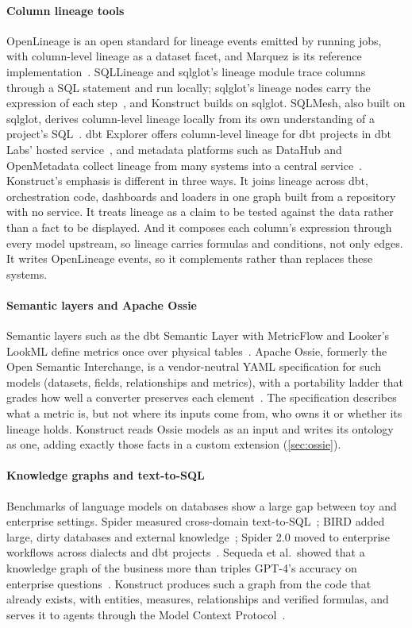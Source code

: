 \paragraph{Column lineage tools}
OpenLineage is an open standard for lineage events emitted by running jobs, with column-level
lineage as a dataset facet, and Marquez is its reference
implementation~\citep{openlineage,marquez}. SQLLineage and sqlglot's lineage module trace columns
through a SQL statement and run locally; sqlglot's lineage nodes carry the expression of each
step~\citep{sqllineage,sqlglot}, and Konstruct builds on sqlglot. SQLMesh, also built on sqlglot,
derives column-level lineage locally from its own understanding of a project's
SQL~\citep{sqlmesh}. dbt Explorer offers column-level lineage for dbt projects in dbt Labs' hosted
service~\citep{dbtcll}, and metadata platforms such as DataHub and OpenMetadata collect lineage
from many systems into a central service~\citep{datahub,openmetadata}. Konstruct's emphasis is
different in three ways. It joins lineage across dbt, orchestration code, dashboards and loaders
in one graph built from a repository with no service. It treats lineage as a claim to be tested
against the data rather than a fact to be displayed. And it composes each column's expression
through every model upstream, so lineage carries formulas and conditions, not only edges. It
writes OpenLineage events, so it complements rather than replaces these systems.

\paragraph{Semantic layers and Apache Ossie}
Semantic layers such as the dbt Semantic Layer with MetricFlow and Looker's LookML define metrics
once over physical tables~\citep{dbtsemantic,lookml}. Apache Ossie, formerly the Open Semantic
Interchange, is a vendor-neutral YAML specification for such models (datasets, fields,
relationships and metrics), with a portability ladder that grades how well a converter preserves
each element~\citep{ossie}. The specification describes what a metric is, but not where its
inputs come from, who owns it or whether its lineage holds. Konstruct reads Ossie models as an
input and writes its ontology as one, adding exactly those facts in a custom extension
(\cref{sec:ossie}).

\paragraph{Knowledge graphs and text-to-SQL}
Benchmarks of language models on databases show a large gap between toy and enterprise settings.
Spider measured cross-domain text-to-SQL~\citep{yu2018spider}; BIRD added large, dirty databases
and external knowledge~\citep{li2023bird}; Spider 2.0 moved to enterprise workflows across
dialects and dbt projects~\citep{lei2025spider2}. Sequeda et al.\ showed that a knowledge graph of
the business more than triples GPT-4's accuracy on enterprise questions~\citep{sequeda2023benchmark}.
Konstruct produces such a graph from the code that already exists, with entities, measures,
relationships and verified formulas, and serves it to agents through the Model Context
Protocol~\citep{mcp}.

